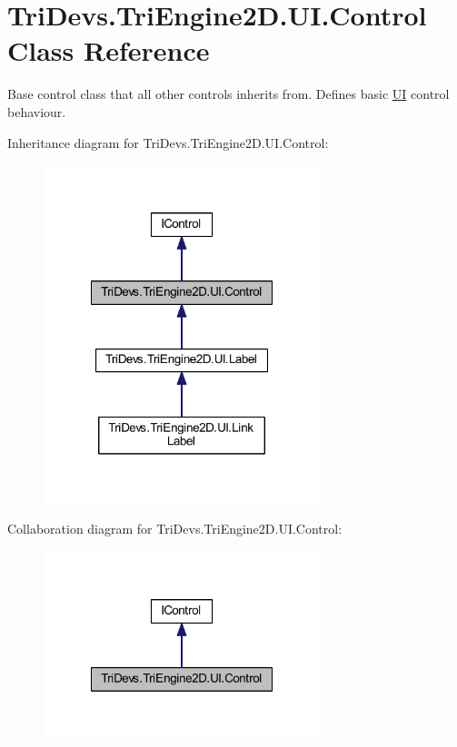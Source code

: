 \hypertarget{class_tri_devs_1_1_tri_engine2_d_1_1_u_i_1_1_control}{\section{Tri\-Devs.\-Tri\-Engine2\-D.\-U\-I.\-Control Class Reference}
\label{class_tri_devs_1_1_tri_engine2_d_1_1_u_i_1_1_control}
}


Base control class that all other controls inherits from. Defines basic \hyperlink{namespace_tri_devs_1_1_tri_engine2_d_1_1_u_i}{U\-I} control behaviour.  




Inheritance diagram for Tri\-Devs.\-Tri\-Engine2\-D.\-U\-I.\-Control\-:
\nopagebreak
\begin{figure}[H]
\begin{center}
\leavevmode
\includegraphics[width=228pt]{class_tri_devs_1_1_tri_engine2_d_1_1_u_i_1_1_control__inherit__graph}
\end{center}
\end{figure}


Collaboration diagram for Tri\-Devs.\-Tri\-Engine2\-D.\-U\-I.\-Control\-:
\nopagebreak
\begin{figure}[H]
\begin{center}
\leavevmode
\includegraphics[width=228pt]{class_tri_devs_1_1_tri_engine2_d_1_1_u_i_1_1_control__coll__graph}
\end{center}
\end{figure}
